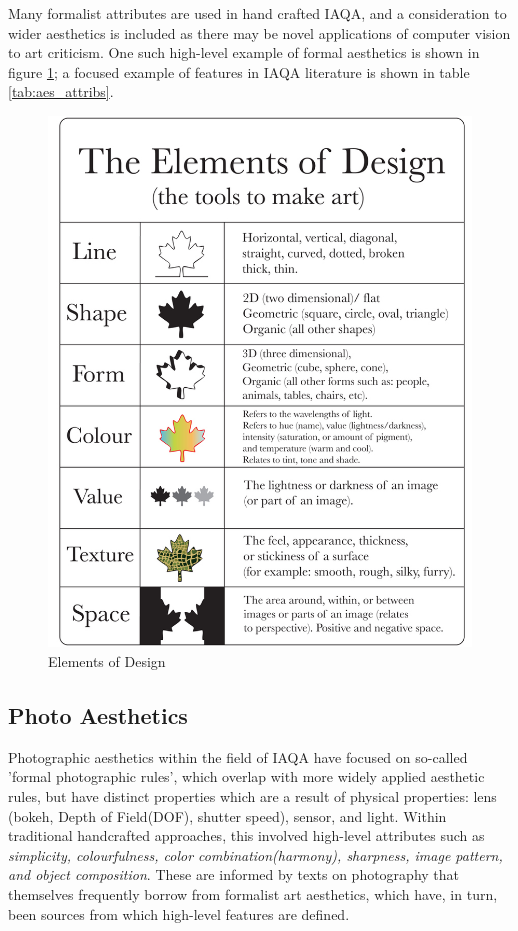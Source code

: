 Many formalist attributes are used in hand crafted IAQA, and a consideration to wider aesthetics is included as there may be novel applications of computer vision to art criticism. One such high-level example of formal aesthetics is shown in figure \ref{fig:elements of design}; a focused example of features in IAQA literature is shown in table \ref{tab:aes_attribs}.

\begin{figure}[h!]
    \centering
    \includegraphics[height=0.4\textwidth]{figures/introduction/art aesthetics/elements3.jpg}
    \caption{Elements of Design \cite{Butler2012}}
    \label{fig:elements of design}
\end{figure}

\subsection{Photo Aesthetics}

Photographic aesthetics within the field of IAQA have focused on so-called 'formal photographic rules', which overlap with more widely applied aesthetic rules, but have distinct properties which are a result of physical properties: lens (bokeh, Depth of Field(DOF), shutter speed), sensor, and light. Within traditional handcrafted approaches, this involved high-level attributes such as \textit{simplicity, colourfulness, color combination(harmony), sharpness, image pattern, and object composition}\cite{Liu2017a,Mavridaki2015,Datta2006,Tang2013a,Simond2015,Lo2013}. These are informed by texts on photography that themselves frequently borrow from formalist art aesthetics, which have, in turn, been sources from which high-level features are defined. 

